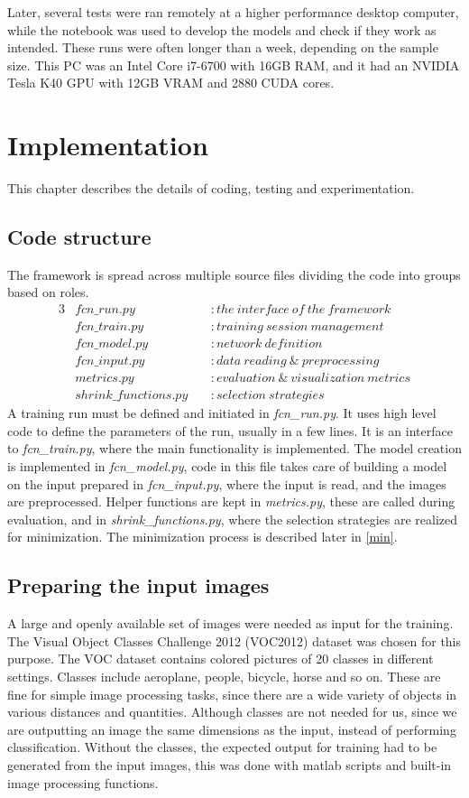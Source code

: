 \documentclass[12pt]{report}
\begin{document}
Later, several tests were ran remotely at a higher performance desktop computer, while the notebook was used to develop the models and check if they work as intended. These runs were often longer than a week, depending on the sample size. This PC was an Intel Core i7-6700 with 16GB RAM, and it had an NVIDIA Tesla K40 GPU with 12GB VRAM and 2880 CUDA cores.
\chapter{Implementation}
This chapter describes the details of coding, testing and experimentation.
\section{Code structure}
The framework is spread across multiple source files dividing the code into groups based on roles.
\begin{alignat*}{3}
	&fcn\_run.py\          &&: the\ interface\ of\ the\ framework \\
	&fcn\_train.py\        &&: training\ session\ management \\
	&fcn\_model.py\        &&: network\ definition \\
	&fcn\_input.py\        &&: data\ reading\ \& \ preprocessing \\
	&metrics.py\           &&: evaluation\ \&\ visualization\ metrics \\
	&shrink\_functions.py\ &&: selection\ strategies
\end{alignat*}
A training run must be defined and initiated in \textit{fcn\_run.py}. It uses high level code to define the parameters of the run, usually in a few lines. It is an interface to \textit{fcn\_train.py}, where the main functionality is implemented. The model creation is implemented in \textit{fcn\_model.py}, code in this file takes care of building a model on the input prepared in \textit{fcn\_input.py}, where the input is read, and the images are preprocessed. Helper functions are kept in \textit{metrics.py}, these are called during evaluation, and in \textit{shrink\_functions.py}, where the selection strategies are realized for minimization. The minimization process is described later in \ref{min}.
\section{Preparing the input images}
A large and openly available set of images were needed as input for the training. The Visual Object Classes Challenge 2012 (VOC2012) dataset \cite{pascal-voc-2012} was chosen for this purpose. The VOC dataset contains colored pictures of 20 classes in different settings. Classes include aeroplane, people, bicycle, horse and so on. These are fine for simple image processing tasks, since there are a wide variety of objects in various distances and quantities. Although classes are not needed for us, since we are outputting an image the same dimensions as the input, instead of performing classification. Without the classes, the expected output for training had to be generated from the input images, this was done with matlab scripts and built-in image processing functions.
\end{document}
